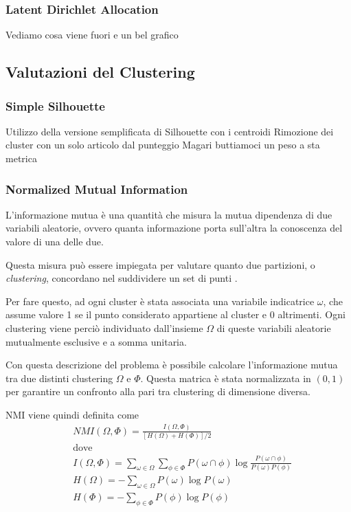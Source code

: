 \documentclass[
	12pt, %
	a4paper, %
	oneside, %
	headinclude,footinclude, %
	BCOR5mm, %
]{scrartcl}
\begin{document}
		\subsubsection{Latent Dirichlet Allocation}

			Vediamo cosa viene fuori e un bel grafico


	\subsection{Valutazioni del Clustering}

		\subsubsection{Simple Silhouette}
			Utilizzo della versione semplificata di Silhouette con i centroidi
			Rimozione dei cluster con un solo articolo dal punteggio
			Magari buttiamoci un peso a sta metrica

		\subsubsection{Normalized Mutual Information}
			L'informazione mutua è una quantità che misura la mutua dipendenza di due variabili aleatorie, ovvero quanta informazione porta sull'altra la conoscenza del valore di una delle due.

			Questa misura può essere impiegata per valutare quanto due partizioni, o \emph{clustering}, concordano nel suddividere un set di punti \cite{Manning}.

			Per fare questo, ad ogni cluster è stata associata una variabile indicatrice $\omega$, che assume valore 1 se il punto considerato appartiene al cluster e 0 altrimenti.
			Ogni clustering viene perciò individuato dall'insieme $\Omega$ di queste variabili aleatorie mutualmente esclusive e a somma unitaria.

			Con questa descrizione del problema è possibile calcolare l'informazione mutua tra due distinti clustering $\Omega$ e $\Phi$.
			Questa matrica è stata normalizzata in $(0, 1)$ per garantire un confronto alla pari tra clustering di dimensione diversa.

			NMI viene quindi definita come
			\begin{equation} \begin{aligned} \label{eq:NMI}
				& NMI(\Omega, \Phi) = \frac
					{I(\Omega, \Phi)}
					{\left[ H(\Omega) + H(\Phi)\right] / 2} \\
				& \text{dove} \\
				& I(\Omega, \Phi) =
					\sum_{\omega \in \Omega} \sum_{\phi \in \Phi}
						P(\omega \cap \phi) \log \frac {P(\omega \cap \phi)} {P(\omega) P(\phi)} \\
				& H(\Omega) = - \sum_{\omega \in \Omega} P(\omega) \log P(\omega) \\
				& H(\Phi) = - \sum_{\phi \in \Phi} P(\phi) \log P(\phi) \\
			\end{aligned} \end{equation}
\end{document}
